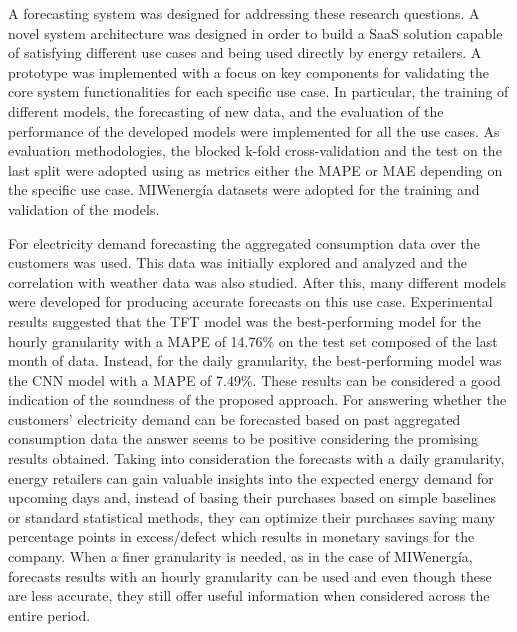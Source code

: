 A forecasting system was designed for addressing these research questions.
A novel system architecture was designed in order to build a SaaS solution capable of satisfying different use cases and being used directly by energy retailers.
A prototype was implemented with a focus on key components for validating the core system functionalities for each specific use case.
In particular, the training of different models, the forecasting of new data, and the evaluation of the performance of the developed models were implemented for all the use cases.
As evaluation methodologies, the blocked k-fold cross-validation and the test on the last split were adopted using as metrics either the MAPE or MAE depending on the specific use case.
MIWenergía datasets were adopted for the training and validation of the models.

For electricity demand forecasting the aggregated consumption data over the customers was used.
This data was initially explored and analyzed and the correlation with weather data was also studied.
After this, many different models were developed for producing accurate forecasts on this use case.
Experimental results suggested that the TFT model was the best-performing model for the hourly granularity with a MAPE of 14.76\% on the test set composed of the last month of data.
Instead, for the daily granularity, the best-performing model was the CNN model with a MAPE of 7.49\%.
These results can be considered a good indication of the soundness of the proposed approach.
For answering whether the customers' electricity demand can be forecasted based on past aggregated consumption data the answer seems to be positive considering the promising results obtained.
Taking into consideration the forecasts with a daily granularity, energy retailers can gain valuable insights into the expected energy demand for upcoming days and, instead of basing their purchases based on simple baselines or standard statistical methods, they can optimize their purchases saving many percentage points in excess/defect which results in monetary savings for the company.
When a finer granularity is needed, as in the case of MIWenergía, forecasts results with an hourly granularity can be used and even though these are less accurate, they still offer useful information when considered across the entire period.

